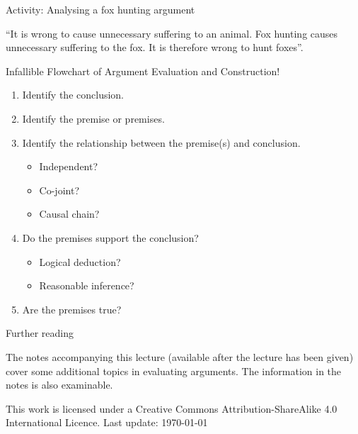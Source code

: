 \documentclass{beamer}
\begin{document}
\begin{frame}{Activity: Analysing a fox hunting argument}

``It is wrong to cause unnecessary suffering to an animal. Fox hunting causes unnecessary suffering to the fox. It is therefore wrong to hunt foxes''.

\end{frame}

\begin{frame}{Infallible Flowchart of Argument Evaluation and Construction!}
\begin{enumerate}
\item Identify the conclusion.
\item Identify the premise or premises.
\item Identify the relationship between the premise(s) and conclusion.
\begin{itemize}
\item Independent?
\item Co-joint?
\item Causal chain?
\end{itemize}
\item Do the premises support the conclusion?
\begin{itemize}
\item Logical deduction?
\item Reasonable inference?
\end{itemize}
\item Are the premises true?
\end{enumerate}

\vspace{12pt}


\end{frame}

\begin{frame}{Further reading}

  The notes accompanying this lecture (available after the lecture has been given) cover some additional topics in evaluating arguments. The information in the notes is also examinable.

\end{frame}

\tiny
This work is licensed under a Creative Commons Attribution-ShareAlike
4.0 International Licence. Last update: \today
\end{document}
